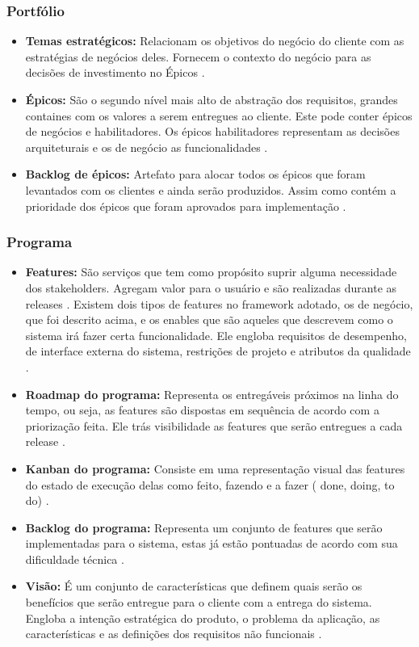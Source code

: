\subsubsection{Portfólio}
\begin{itemize}
    \item \textbf{Temas estratégicos:} Relacionam os objetivos do negócio do cliente com as estratégias de negócios deles. Fornecem o contexto do negócio para as decisões de investimento no Épicos \cite{safe}.
    \item \textbf{Épicos:} São o segundo nível mais alto de abstração dos requisitos, grandes containes com os valores a serem entregues ao cliente. Este pode conter épicos de negócios e habilitadores. Os épicos habilitadores representam as decisões arquiteturais e os de negócio as funcionalidades \cite{safe}.
    \item \textbf{Backlog de épicos:} Artefato para alocar todos os épicos que foram levantados com os clientes e ainda serão produzidos. Assim como contém a prioridade dos épicos que foram aprovados para implementação \cite{safe}.
\end{itemize}

\subsubsection{Programa}
\begin{itemize}
    \item \textbf{Features:} São serviços que tem como propósito suprir alguma necessidade dos stakeholders. Agregam valor para o usuário e são realizadas durante as releases \cite{leffingwell2011}. Existem dois tipos de features no framework adotado, os de negócio, que foi descrito acima, e os enables que são aqueles que descrevem como o sistema irá fazer certa funcionalidade. Ele engloba requisitos de desempenho, de interface externa do sistema, restrições de projeto e atributos da qualidade \cite{safe}.
    \item \textbf{Roadmap do programa:} Representa os entregáveis próximos na linha do tempo, ou seja, as features são dispostas em sequência de acordo com a priorização feita. Ele trás visibilidade as features que serão entregues a cada release \cite{safe}.
    \item \textbf{Kanban do programa:} Consiste em uma representação visual das features do estado de execução delas como feito, fazendo e a fazer ( done, doing, to do) \cite{leffingwell2011}.
    \item \textbf{Backlog do programa:} Representa um conjunto de features que serão implementadas para o sistema, estas já estão pontuadas de acordo com sua dificuldade técnica \cite{safe}.
    \item \textbf{Visão:} É um conjunto de características que definem quais serão os benefícios que serão entregue para o cliente com a entrega do sistema. Engloba a intenção estratégica do produto, o problema da aplicação, as características e as definições dos requisitos não funcionais \cite{leffingwell2011}. 
\end{itemize}
